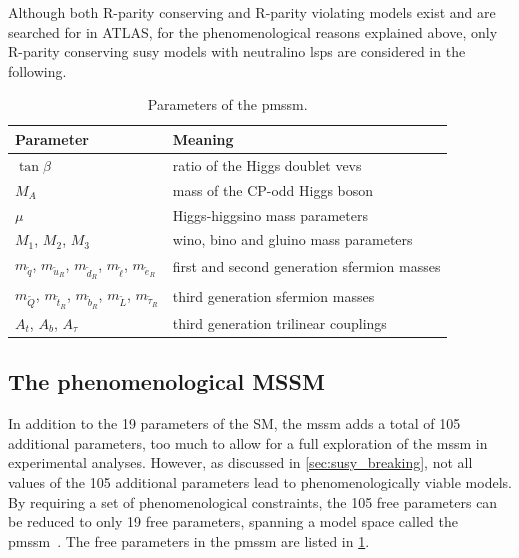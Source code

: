 Although both R-parity conserving and R-parity violating models exist and are searched for in ATLAS, for the phenomenological reasons explained above, only R-parity conserving \gls{susy} models with neutralino \glspl{lsp} are considered in the following.

\begin{table}
	\centering
	\setlength\heavyrulewidth{0.2ex}
	\small
	\caption{Parameters of the \gls{pmssm}.}
	\begin{tabular} {l l}
	\toprule
		Parameter & Meaning \\ 
	\midrule
	$\tan{\beta}$ & ratio of the Higgs doublet \glspl{vev} \\
	$M_A$ & mass of the CP-odd Higgs boson \\
	$\mu$ & Higgs-higgsino mass parameters \\
	$M_1$, $M_2$, $M_3$ & wino, bino and gluino mass parameters \\
	$m_{\tilde{q}}$, $m_{\tilde{u}_R}$, $m_{\tilde{d}_R}$, $m_{\tilde{\ell}}$, $m_{\tilde{e}_R}$ & first and second generation sfermion masses \\
	$m_{\tilde{Q}}$, $m_{\tilde{t}_R}$, $m_{\tilde{b}_R}$, $m_{\tilde{L}}$, $m_{\tilde{\tau}_R}$ & third generation sfermion masses \\
	$A_t$, $A_b$, $A_\tau$ & third generation trilinear couplings \\
	\bottomrule					
	\end{tabular}\vspace{3mm}
	\label{tab:parameters_pmssm}   
\end{table}

\subsection{The phenomenological MSSM}\label{sec:theory_pmssm}

In addition to the 19 parameters of the SM, the \gls{mssm} adds a total of 105 additional parameters, too much to allow for a full exploration of the \gls{mssm} in experimental analyses. However, as discussed in \cref{sec:susy_breaking}, not all values of the 105 additional parameters lead to phenomenologically viable models. By requiring a set of phenomenological constraints, the 105 free parameters can be reduced to only 19 free parameters, spanning a model space called the \gls{pmssm}~\cite{Djouadi:2002ze,Berger_2009}. The free parameters in the \gls{pmssm} are listed in \cref{tab:parameters_pmssm}.

